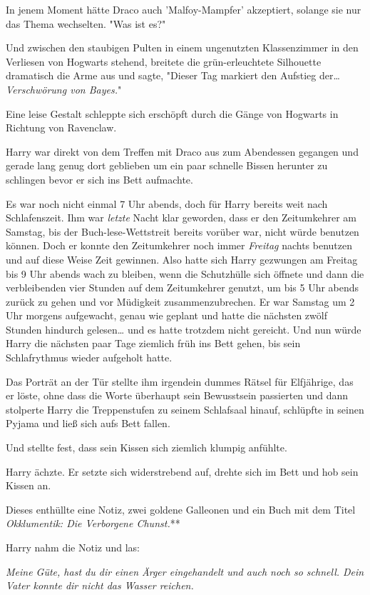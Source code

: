{In jenem Moment hätte Draco auch 'Malfoy-Mampfer' akzeptiert, solange sie nur das Thema wechselten. "Was ist es?"

Und zwischen den staubigen Pulten in einem ungenutzten Klassenzimmer in den Verliesen von Hogwarts stehend, breitete die grün-erleuchtete Silhouette dramatisch die Arme aus und sagte, "Dieser Tag markiert den Aufstieg der… \emph{Verschwörung von Bayes.}"

\later

Eine leise Gestalt schleppte sich erschöpft durch die Gänge von Hogwarts in Richtung von Ravenclaw.

Harry war direkt von dem Treffen mit Draco aus zum Abendessen gegangen und gerade lang genug dort geblieben um ein paar schnelle Bissen herunter zu schlingen bevor er sich ins Bett aufmachte.

Es war noch nicht einmal 7 Uhr abends, doch für Harry bereits weit nach Schlafenszeit. Ihm war \emph{letzte} Nacht klar geworden, dass er den Zeitumkehrer am Samstag, bis der Buch-lese-Wettstreit bereits vorüber war, nicht würde benutzen können. Doch er konnte den Zeitumkehrer noch immer \emph{Freitag} nachts benutzen und auf diese Weise Zeit gewinnen. Also hatte sich Harry gezwungen am Freitag bis 9 Uhr abends wach zu bleiben, wenn die Schutzhülle sich öffnete und dann die verbleibenden vier Stunden auf dem Zeitumkehrer genutzt, um bis 5 Uhr abends zurück zu gehen und vor Müdigkeit zusammenzubrechen. Er war Samstag um 2 Uhr morgens aufgewacht, genau wie geplant und hatte die nächsten zwölf Stunden hindurch gelesen… und es hatte trotzdem nicht gereicht. Und nun würde Harry die nächsten paar Tage ziemlich früh ins Bett gehen, bis sein Schlafrythmus wieder aufgeholt hatte.

Das Porträt an der Tür stellte ihm irgendein dummes Rätsel für Elfjährige, das er löste, ohne dass die Worte überhaupt sein Bewusstsein passierten und dann stolperte Harry die Treppenstufen zu seinem Schlafsaal hinauf, schlüpfte in seinen Pyjama und ließ sich aufs Bett fallen.

Und stellte fest, dass sein Kissen sich ziemlich klumpig anfühlte.

Harry ächzte. Er setzte sich widerstrebend auf, drehte sich im Bett und hob sein Kissen an.

Dieses enthüllte eine Notiz, zwei goldene Galleonen und ein Buch mit dem Titel \emph{Okklumentik: Die Verborgene Chunst.}**

Harry nahm die Notiz und las:

\emph{Meine Güte, hast du dir einen Ärger eingehandelt und auch noch so schnell. Dein Vater konnte dir nicht das Wasser reichen.}

}
